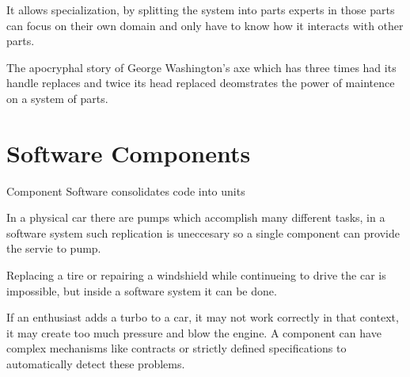 \documentclass{report}
\begin{document}
It allows specialization, by splitting the system into parts experts in those parts can focus on their own domain and only have to know how it interacts with other parts.

The apocryphal story of George Washington's axe which has three times had its handle replaces and twice its head replaced deomstrates the power of maintence on a system of parts.




\section{Software Components}
Component Software consolidates code into units

In a physical car there are pumps which accomplish many different tasks, in a software system such replication is uneccesary so a single component can provide the servie to pump.

Replacing a tire or repairing a windshield while continueing to drive the car is impossible, but inside a software system it can be done.

If an enthusiast adds a turbo to a car, it may not work correctly in that context, it may create too much pressure and blow the engine.
A component can have complex mechanisms like contracts or strictly defined specifications to automatically detect these problems.
\end{document}
